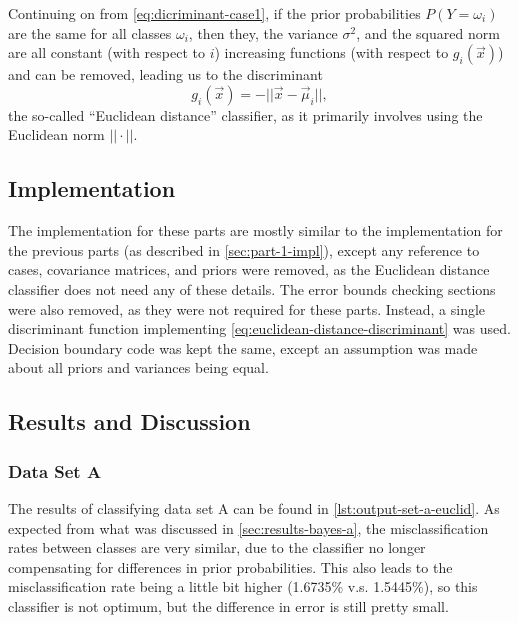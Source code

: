\documentclass[headings=optiontoheadandtoc,listof=totoc,parskip=full]{scrartcl}
\begin{document}
Continuing on from \cref{eq:dicriminant-case1}, if the prior probabilities $P(Y = \omega_i)$ are the same for all classes $\omega_i$, then they, the variance $\sigma^2$, and the squared norm are all constant (with respect to $i$) increasing functions (with respect to $g_i(\vec x)$) and can be removed, leading us to the discriminant
\begin{equation}
	g_i(\vec x) = -||\vec x - \vec\mu_i||, \label{eq:euclidean-distance-discriminant}
\end{equation}
the so-called ``Euclidean distance'' classifier, as it primarily involves using the Euclidean norm $||\cdot||$.

\subsection{Implementation}
\label{sec:part-2-impl}

The implementation for these parts are mostly similar to the implementation for the previous parts (as described in \cref{sec:part-1-impl}), except any reference to cases, covariance matrices, and priors were removed, as the Euclidean distance classifier does not need any of these details. The error bounds checking sections were also removed, as they were not required for these parts. Instead, a single discriminant function implementing \cref{eq:euclidean-distance-discriminant} was used. Decision boundary code was kept the same, except an assumption was made about all priors and variances being equal.

\subsection{Results and Discussion}

\subsubsection{Data Set A}

The results of classifying data set A can be found in \cref{lst:output-set-a-euclid}. As expected from what was discussed in \cref{sec:results-bayes-a}, the misclassification rates between classes are very similar, due to the classifier no longer compensating for differences in prior probabilities. This also leads to the misclassification rate being a little bit higher (1.6735\% v.s. 1.5445\%), so this classifier is not optimum, but the difference in error is still pretty small.


\end{document}
